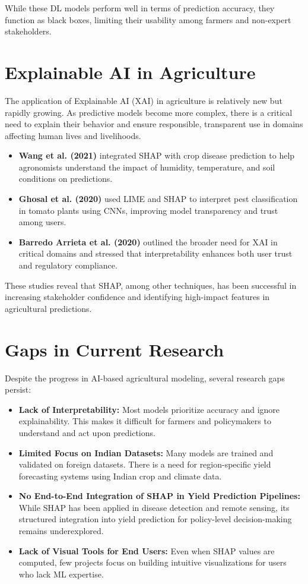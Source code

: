 \documentclass[a4paper,11pt,oneside]{book}
\begin{document}
While these DL models perform well in terms of prediction accuracy, they function as black boxes, limiting their usability among farmers and non-expert stakeholders.

\section{Explainable AI in Agriculture}

The application of Explainable AI (XAI) in agriculture is relatively new but rapidly growing. As predictive models become more complex, there is a critical need to explain their behavior and ensure responsible, transparent use in domains affecting human lives and livelihoods.

\begin{itemize}
    \item \textbf{Wang et al. (2021)} integrated SHAP with crop disease prediction to help agronomists understand the impact of humidity, temperature, and soil conditions on predictions.
    \item \textbf{Ghosal et al. (2020)} used LIME and SHAP to interpret pest classification in tomato plants using CNNs, improving model transparency and trust among users.
    \item \textbf{Barredo Arrieta et al. (2020)} outlined the broader need for XAI in critical domains and stressed that interpretability enhances both user trust and regulatory compliance.
\end{itemize}

These studies reveal that SHAP, among other techniques, has been successful in increasing stakeholder confidence and identifying high-impact features in agricultural predictions.

\section{Gaps in Current Research}

Despite the progress in AI-based agricultural modeling, several research gaps persist:

\begin{itemize}
    \item \textbf{Lack of Interpretability:} Most models prioritize accuracy and ignore explainability. This makes it difficult for farmers and policymakers to understand and act upon predictions.
    \item \textbf{Limited Focus on Indian Datasets:} Many models are trained and validated on foreign datasets. There is a need for region-specific yield forecasting systems using Indian crop and climate data.
    \item \textbf{No End-to-End Integration of SHAP in Yield Prediction Pipelines:} While SHAP has been applied in disease detection and remote sensing, its structured integration into yield prediction for policy-level decision-making remains underexplored.
    \item \textbf{Lack of Visual Tools for End Users:} Even when SHAP values are computed, few projects focus on building intuitive visualizations for users who lack ML expertise.
\end{itemize}
\end{document}
